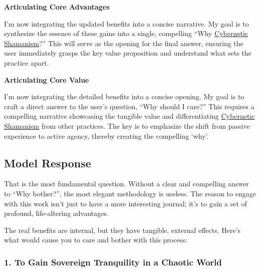 \documentclass{article}
\begin{document}
\textbf{Articulating Core Advantages}

I'm now integrating the updated benefits into a concise narrative. My goal is to synthesize the essence of these gains into a single, compelling ``Why \hyperlink{gloss:cybernetic_shamanism}{Cybernetic Shamanism}?'' This will serve as the opening for the final answer, ensuring the user immediately grasps the key value proposition and understand what sets the practice apart.

\textbf{Articulating Core Value}

I'm now integrating the detailed benefits into a concise opening. My goal is to craft a direct answer to the user's question, ``Why should I care?'' This requires a compelling narrative showcasing the tangible value and differentiating \hyperlink{gloss:cybernetic_shamanism}{Cybernetic Shamanism} from other practices. The key is to emphasize the shift from passive experience to active agency, thereby creating the compelling `why'.

\subsection*{Model Response}\label{model-response}

That is the most fundamental question. Without a clear and compelling answer to ``Why bother?'', the most elegant methodology is useless. The reason to engage with this work isn't just to have a more interesting journal; it's to gain a set of profound, life-altering advantages.

The real benefits are internal, but they have tangible, external effects. Here's what would cause you to care and bother with this process:

\subsubsection*{1. To Gain Sovereign Tranquility in a Chaotic World}\label{to-gain-sovereign-tranquility-in-a-chaotic-world}
\end{document}
